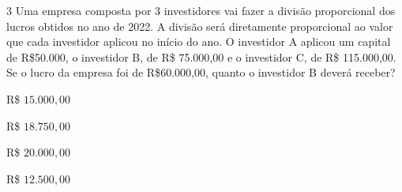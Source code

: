 
\num{3} Uma empresa composta por 3 investidores vai fazer a divisão
proporcional dos lucros obtidos no ano de 2022. A divisão será
diretamente proporcional ao valor que cada investidor aplicou no início
do ano. O investidor A aplicou um capital de R\$50.000, o investidor B,
de R\$ 75.000,00 e o investidor C, de R\$ 115.000,00. Se o lucro da
empresa foi de R\$60.000,00, quanto o investidor B deverá receber?

\begin{escolha}
\item R\$ $15.000,00$
\item R\$ $18.750,00$
\item R\$ $20.000,00$
\item R\$ $12.500,00$
\end{escolha}



